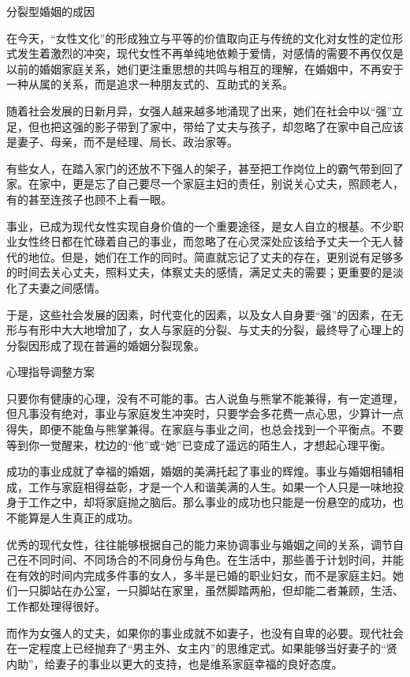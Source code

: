 \documentclass[12pt,UTF8]{ctexbook}
\begin{document}
分裂型婚姻的成因


在今天，“女性文化”的形成独立与平等的价值取向正与传统的文化对女性的定位形式发生着激烈的冲突，现代女性不再单纯地依赖于爱情，对感情的需要不再仅仅是以前的婚姻家庭关系，她们更注重思想的共鸣与相互的理解，在婚姻中，不再安于一种从属的关系，而是追求一种朋友式的、互助式的关系。

随着社会发展的日新月异，女强人越来越多地涌现了出来，她们在社会中以“强”立足，但也把这强的影子带到了家中，带给了丈夫与孩子，却忽略了在家中自己应该是妻子、母亲，而不是经理、局长、政治家等。

有些女人，在踏入家门的还放不下强人的架子，甚至把工作岗位上的霸气带到回了家。在家中，更是忘了自己要尽一个家庭主妇的责任，别说关心丈夫，照顾老人，有的甚至连孩子也顾不上看一眼。

事业，已成为现代女性实现自身价值的一个重要途径，是女人自立的根基。不少职业女性终日都在忙碌着自己的事业，而忽略了在心灵深处应该给予丈夫一个无人替代的地位。但是，她们在工作的同时。简直就忘记了丈夫的存在，更别说有足够多的时间去关心丈夫，照料丈夫，体察丈夫的感情，满足丈夫的需要；更重要的是淡化了夫妻之间感情。

于是，这些社会发展的因素，时代变化的因素，以及女人自身要“强”的因素，在无形与有形中大大地增加了，女人与家庭的分裂、与丈夫的分裂，最终导了心理上的分裂因形成了现在普遍的婚姻分裂现象。





心理指导调整方案


只要你有健康的心理，没有不可能的事。古人说鱼与熊掌不能兼得，有一定道理，但凡事没有绝对，事业与家庭发生冲突时，只要学会多花费一点心思，少算计一点得失，即便不能鱼与熊掌兼得。在家庭与事业之间，也总会找到一个平衡点。不要等到你一觉醒来，枕边的“他”或“她”已变成了遥远的陌生人，才想起心理平衡。

成功的事业成就了幸福的婚姻，婚姻的美满托起了事业的辉煌。事业与婚姻相辅相成，工作与家庭相得益彰，才是一个人和谐美满的人生。如果一个人只是一味地投身于工作之中，却将家庭抛之脑后。那么事业的成功也只能是一份悬空的成功，也不能算是人生真正的成功。

优秀的现代女性，往往能够根据自己的能力来协调事业与婚姻之间的关系，调节自己在不同时间、不同场合的不同身份与角色。在生活中，那些善于计划时间，并能在有效的时间内完成多件事的女人，多半是已婚的职业妇女，而不是家庭主妇。她们一只脚站在办公室，一只脚站在家里，虽然脚踏两船，但却能二者兼顾，生活、工作都处理得很好。

而作为女强人的丈夫，如果你的事业成就不如妻子，也没有自卑的必要。现代社会在一定程度上已经抛弃了“男主外、女主内”的思维定式。如果能够当好妻子的“贤内助”，给妻子的事业以更大的支持，也是维系家庭幸福的良好态度。
\end{document}
